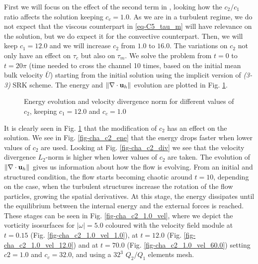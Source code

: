 First we will focus on the effect of the second term in , looking how the $c_2/c_1$ ratio affects the solution keeping $c_c=1.0$. As we are in a turbulent regime, we do not expect that the viscous counterpart in \ref{eq-C5_tau_m} will have relevance on the solution, but we do expect it for the convective counterpart. Then, we will keep $c_1=12.0$ and we will increase $c_2$ from $1.0$ to $16.0$. The variations on $c_2$ not only have an effect on $\tau_c$ but also on $\tau_m$. We solve the problem from $t=0$ to $t=20\pi$ (time needed to cross the channel 10 times, based on the initial mean bulk velocity $\bar{U}$) starting from the initial solution  using the implicit version of \textit{(3-3)} SRK scheme. The energy and $\|\nabla\cdot{\bf u}_h\|$ evolution are plotted in Fig. \ref{fig-cha_c2}.
\begin{figure}[h!]
  \centering
  \caption{Energy evolution and velocity divergence norm for different values of $c_2$, keeping $c_1=12.0$ and $c_c=1.0$}
  \label{fig-cha_c2}
\end{figure}
It is clearly seen in Fig. \ref{fig-cha_c2} that the modification of $c_2$ has an effect on the solution. We see in Fig. \ref{fig-cha_c2_ene} that the energy drops faster when lower values of $c_2$ are used. Looking at Fig. \ref{fig-cha_c2_div} we see that the velocity divergence $L_2$-norm is higher when lower values of $c_2$ are taken. The evolution of $\|\nabla\cdot{\bf u}_h\|$ gives us information about how the flow is evolving. From an initial and structured condition, the flow starts becoming chaotic around $t=10$, depending on the case, when the turbulent structures increase the rotation of the flow particles, growing the spatial derivatives. At this stage, the energy dissipates until the equilibrium between the internal energy and the external forces is reached. These stages can be seen in Fig. \ref{fig-cha_c2_1.0_vel}, where we depict the vorticity isosurfaces for $|\omega|=5.0$ coloured with the velocity field module at $t=0.15$ (Fig. \ref{fig-cha_c2_1.0_vel_1.0}),  at $t=12.0$ (Fig. \ref{fig-cha_c2_1.0_vel_12.0}) and at $t=70.0$ (Fig. \ref{fig-cha_c2_1.0_vel_60.0}) setting $c2=1.0$ and $c_c=32.0$, and using a $32^3$ $Q_2/Q_1$ elements mesh.
